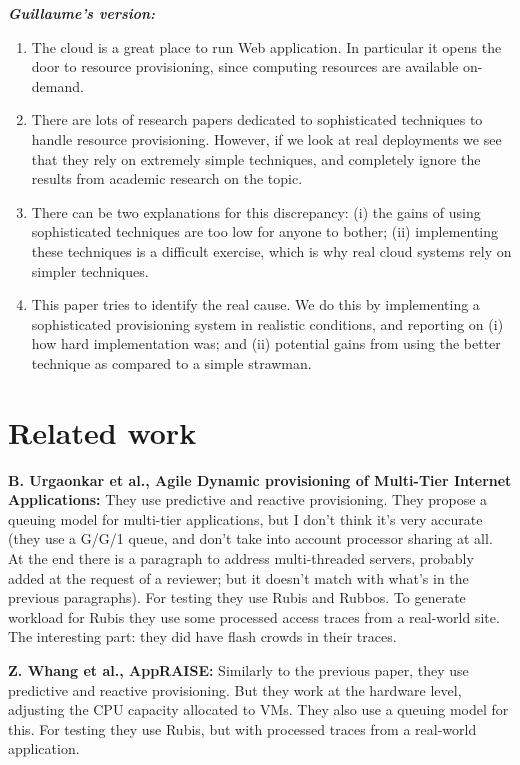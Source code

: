 \documentclass[10pt,twocolumn]{article}
\begin{document}
{\em \textbf{Guillaume's version:}
  \begin{enumerate}
  \item The cloud is a great place to run Web application. In
    particular it opens the door to resource provisioning, since
    computing resources are available on-demand.
  \item There are lots of research papers dedicated to sophisticated
    techniques to handle resource provisioning. However, if we look at
    real deployments we see that they rely on extremely simple
    techniques, and completely ignore the results from academic
    research on the topic.
  \item There can be two explanations for this discrepancy: (i) the
    gains of using sophisticated techniques are too low for anyone to
    bother; (ii) implementing these techniques is a difficult
    exercise, which is why real cloud systems rely on simpler
    techniques.
  \item This paper tries to identify the real cause. We do this by
    implementing a sophisticated provisioning system in realistic
    conditions, and reporting on (i) how hard implementation was; and
    (ii) potential gains from using the better technique as compared
    to a simple strawman.
  \end{enumerate}
}

\section*{Related work}

{\bf B. Urgaonkar et al., Agile Dynamic provisioning of Multi-Tier Internet Applications:}
They use predictive and reactive provisioning. They propose a queuing model
for multi-tier applications, but I don't think it's very accurate (they use
a G/G/1 queue, and don't take into account processor sharing at all. At
the end there is a paragraph to address multi-threaded servers, probably
added at the request of a reviewer; but it doesn't match with what's 
in the previous paragraphs). For testing they use Rubis and Rubbos. To generate
workload for Rubis they use some processed access traces from a real-world site.
The interesting part: they did have flash crowds in their traces. 

{\bf Z. Whang et al., AppRAISE:}
Similarly to the previous paper, they use predictive and reactive provisioning.
But they work at the hardware level, adjusting the CPU capacity allocated to
VMs. They also use a queuing model for this. For testing they use Rubis,
but with processed traces from a real-world application.
\end{document}

